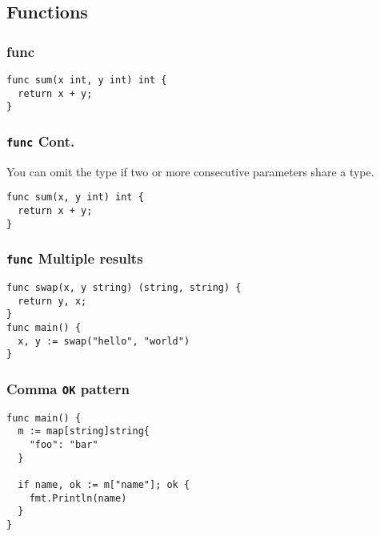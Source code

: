 \documentclass[xetex,mathserif,serif,12pt]{beamer}
\begin{document}
\subsection{Functions}

\begin{frame}[fragile]
  \frametitle{\ttfamily func}

  \begin{beamer@nomargin}
    \begin{lstlisting}
func sum(x int, y int) int {
  return x + y;
}
    \end{lstlisting}
  \end{beamer@nomargin}
\end{frame}

\begin{frame}[fragile]
  \frametitle{\texttt{func} Cont.}

  You can omit the type if two or more consecutive parameters share a type.
  \newline

  \begin{beamer@nomargin}
    \begin{lstlisting}
func sum(x, y int) int {
  return x + y;
}
    \end{lstlisting}
  \end{beamer@nomargin}
\end{frame}

\begin{frame}[fragile]
  \frametitle{\texttt{func} Multiple results}

  \begin{beamer@nomargin}
    \begin{lstlisting}
func swap(x, y string) (string, string) {
  return y, x;
}
func main() {
  x, y := swap("hello", "world")
}
    \end{lstlisting}
  \end{beamer@nomargin}
\end{frame}

\begin{frame}[fragile]
  \frametitle{Comma \texttt{OK} pattern}

  \begin{beamer@nomargin}
    \begin{lstlisting}
func main() {
  m := map[string]string{
    "foo": "bar"
  }

  if name, ok := m["name"]; ok {
    fmt.Println(name)  
  }
}
    \end{lstlisting}
  \end{beamer@nomargin}
\end{frame}
\end{document}
